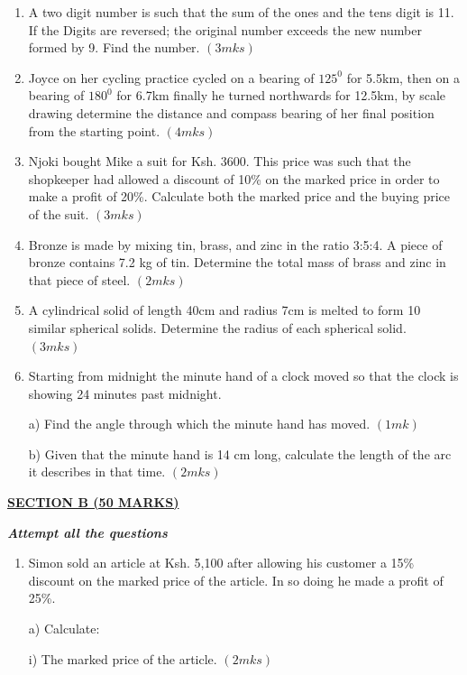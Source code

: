 \documentclass[
  a4paperpaper,
]{scrbook}
\begin{document}
\begin{tcolorbox}
\begin{enumerate}
\def\labelenumi{\arabic{enumi}.}
\setcounter{enumi}{10}
\item
  A two digit number is such that the sum of the ones and the tens digit
  is 11. If the Digits are reversed; the original number exceeds the new
  number formed by 9. Find the number. \((3mks)\)
\item
  Joyce on her cycling practice cycled on a bearing of \(125^0\) for
  5.5km, then on a bearing of \(180^0\) for 6.7km finally he turned
  northwards for 12.5km, by scale drawing determine the distance and
  compass bearing of her final position from the starting point.
  \((4mks)\)
\item
  Njoki bought Mike a suit for Ksh. 3600. This price was such that the
  shopkeeper had allowed a discount of 10\% on the marked price in order
  to make a profit of 20\%. Calculate both the marked price and the
  buying price of the suit. \((3mks)\)
\item
  Bronze is made by mixing tin, brass, and zinc in the ratio 3:5:4. A
  piece of bronze contains 7.2 kg of tin. Determine the total mass of
  brass and zinc in that piece of steel. \((2mks)\)
\item
  A cylindrical solid of length 40cm and radius 7cm is melted to form 10
  similar spherical solids. Determine the radius of each spherical
  solid. \((3mks)\)
\item
  Starting from midnight the minute hand of a clock moved so that the
  clock is showing 24 minutes past midnight.

  a) Find the angle through which the minute hand has moved. \((1mk)\)

  b) Given that the minute hand is 14 cm long, calculate the length of
  the arc it describes in that time. \((2mks)\)
\end{enumerate}

\ul{\textbf{SECTION B (50 MARKS)}}

\textbf{\emph{Attempt all the questions}}

\begin{enumerate}
\def\labelenumi{\arabic{enumi}.}
\setcounter{enumi}{16}
\item
  Simon sold an article at Ksh. 5,100 after allowing his customer a 15\%
  discount on the marked price of the article. In so doing he made a
  profit of 25\%.

  a) Calculate:

  i) The marked price of the article. \((2mks)\)


\end{enumerate}
\end{tcolorbox}
\end{document}
